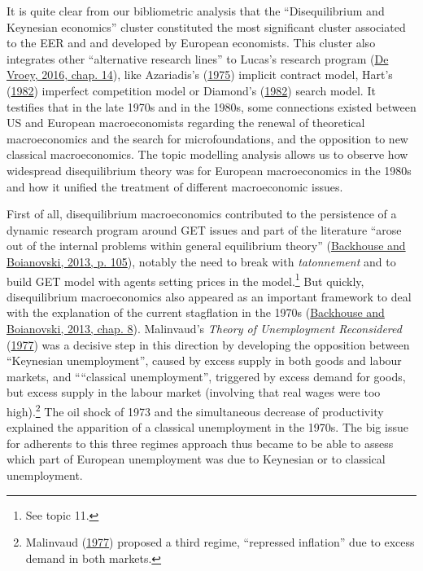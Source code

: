 \documentclass[]{elsarticle} %
\begin{document}
It is quite clear from our bibliometric analysis that the
``Disequilibrium and Keynesian economics'' cluster constituted the most
significant cluster associated to the EER and and developed by European
economists. This cluster also integrates other ``alternative research
lines'' to Lucas's research program
(\protect\hyperlink{ref-devroey2016}{De Vroey, 2016, chap. 14}), like
Azariadis's (\protect\hyperlink{ref-azariadis1975}{1975}) implicit
contract model, Hart's (\protect\hyperlink{ref-hart1982}{1982})
imperfect competition model or Diamond's
(\protect\hyperlink{ref-diamond1982}{1982}) search model. It testifies
that in the late 1970s and in the 1980s, some connections existed
between US and European macroeconomists regarding the renewal of
theoretical macroeconomics and the search for microfoundations, and the
opposition to new classical macroeconomics. The topic modelling analysis
allows us to observe how widespread disequilibrium theory was for
European macroeconomics in the 1980s and how it unified the treatment of
different macroeconomic issues.

First of all, disequilibrium macroeconomics contributed to the
persistence of a dynamic research program around GET issues and part of
the literature ``arose out of the internal problems within general
equilibrium theory''
(\protect\hyperlink{ref-backhouseboianovski2013}{Backhouse and
Boianovski, 2013, p. 105}), notably the need to break with
\emph{tatonnement} and to build GET model with agents setting prices in
the model.\footnote{See topic 11.} But quickly, disequilibrium
macroeconomics also appeared as an important framework to deal with the
explanation of the current stagflation in the 1970s
(\protect\hyperlink{ref-backhouseboianovski2013}{Backhouse and
Boianovski, 2013, chap. 8}). Malinvaud's \emph{Theory of Unemployment
Reconsidered} (\protect\hyperlink{ref-malinvaud1977}{1977}) was a
decisive step in this direction by developing the opposition between
``Keynesian unemployment'', caused by excess supply in both goods and
labour markets, and ````classical unemployment'', triggered by excess
demand for goods, but excess supply in the labour market (involving that
real wages were too high).\footnote{Malinvaud
  (\protect\hyperlink{ref-malinvaud1977}{1977}) proposed a third regime,
  ``repressed inflation'' due to excess demand in both markets.} The oil
shock of 1973 and the simultaneous decrease of productivity explained
the apparition of a classical unemployment in the 1970s. The big issue
for adherents to this three regimes approach thus became to be able to
assess which part of European unemployment was due to Keynesian or to
classical unemployment.
\end{document}
